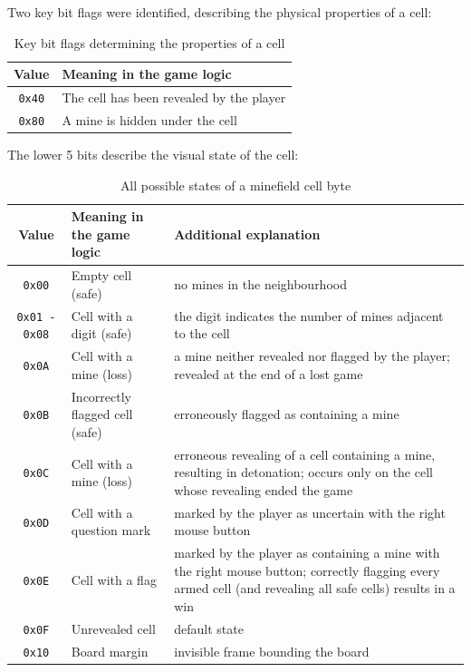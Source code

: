 \documentclass[11pt,a4paper]{article}
\begin{document}
Two key bit flags were identified, describing the physical properties of a cell:

\begin{table}[htbp]
\centering
\caption{Key bit flags determining the properties of a cell}
\begin{tabular}{|c|>{\raggedright\arraybackslash}p{}|}
\hline
\textbf{Value} & \textbf{Meaning in the game logic} \\
\hline
\texttt{0x40} & The cell has been revealed by the player \\
\hline
\texttt{0x80} & A mine is hidden under the cell \\
\hline
\end{tabular}
\end{table}

The lower 5 bits describe the visual state of the cell:

\begin{table}[htbp]
\centering
\caption{All possible states of a minefield cell byte}
\begin{tabular}{|c|>{\raggedright\arraybackslash}p{}|>{\raggedright\arraybackslash}p{}|}
\hline
\textbf{Value} & \textbf{Meaning in the game logic} & \textbf{Additional explanation} \\
\hline
\texttt{0x00} & Empty cell (safe) & no mines in the neighbourhood \\
\hline
\texttt{0x01 - 0x08} & Cell with a digit (safe) & the digit indicates the number of mines adjacent to the cell \\
\hline
\texttt{0x0A} & Cell with a mine (loss) & a mine neither revealed nor flagged by the player; revealed at the end of a lost game \\
\hline
\texttt{0x0B} & Incorrectly flagged cell (safe) & erroneously flagged as containing a mine \\
\hline
\texttt{0x0C} & Cell with a mine (loss) & erroneous revealing of a cell containing a mine, resulting in detonation; occurs only on the cell whose revealing ended the game \\
\hline
\texttt{0x0D} & Cell with a question mark & marked by the player as uncertain with the right mouse button \\
\hline
\texttt{0x0E} & Cell with a flag & marked by the player as containing a mine with the right mouse button; correctly flagging every armed cell (and revealing all safe cells) results in a win \\
\hline
\texttt{0x0F} & Unrevealed cell & default state \\
\hline
\texttt{0x10} & Board margin & invisible frame bounding the board \\
\hline
\end{tabular}
\end{table}
\end{document}
